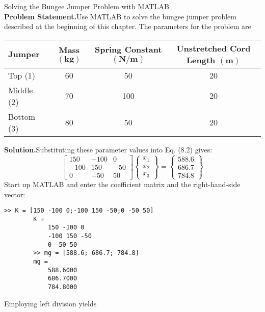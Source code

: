 \documentclass[../main.tex]{subfiles}
\begin{document}
\begin{example} Solving the Bungee Jumper Problem with MATLAB\\

    \noindent\textbf{Problem Statement.}\quad Use MATLAB to solve the bungee jumper problem described at the beginning of this chapter. The parameters for the problem are\\

    \begin{tabular}{lccc}
        \hline Jumper & Mass $(\mathbf{k g})$ & Spring Constant $(\mathbf{N} / \mathbf{m})$ & Unstretched Cord Length $(\mathbf{m})$ \\
        \hline Top (1) & 60 & 50 & 20 \\
        Middle (2) & 70 & 100 & 20 \\
        Bottom (3) & 80 & 50 & 20 \\
        \hline
    \end{tabular}
    \bigskip

    \noindent\textbf{Solution.}\quad Substituting these parameter values into Eq. (8.2) gives:\\

    $$
    \left[\begin{array}{rrr}
    150 & -100 & 0 \\
    -100 & 150 & -50 \\
    0 & -50 & 50
    \end{array}\right]\left\{\begin{array}{l}
    x_{1} \\
    x_{2} \\
    x_{3}
    \end{array}\right\}=\left\{\begin{array}{l}
    588.6 \\
    686.7 \\
    784.8
    \end{array}\right\}
    $$
    Start up MATLAB and enter the coefficient matrix and the right-hand-side vector:
    
    \begin{lstlisting}[numbers=none,frame=none]
        >> K = [150 -100 0;-100 150 -50;0 -50 50]
        K =
            150 -100 0
            -100 150 -50
            0 -50 50
        >> mg = [588.6; 686.7; 784.8]
        mg =
            588.6000
            686.7000
            784.8000
	\end{lstlisting}

    \noindent Employing left division yields


\end{example}
\end{document}
